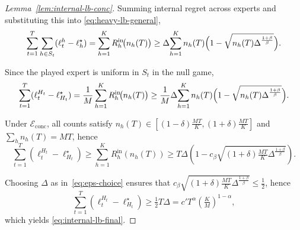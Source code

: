 \documentclass[a4paper,14pt]{extarticle}
\theoremstyle{plain}
\begin{document}
\begin{proof}[ Lemma~\ref{lem:internal-lb-conc}]
Summing internal regret across experts and substituting this into \eqref{eq:heavy-lb-general},
\begin{equation*}
\sum_{t=1}^T \sum_{h\in S_t} (\ell_t^h - \ell_h^\star) =\sum_{h=1}^K R_h^{\mathrm{in}}\!\bigl(n_h(T)\bigr) \ge
\Delta \!\sum_{h=1}^K n_h(T)\Bigl(1 -\sqrt{n_h(T)\Delta^{\frac{1+\beta}{\beta}}}\Bigr).
\end{equation*}

Since the played expert is uniform in $S_t$ in the null game,
\begin{equation*}
\sum_{t=1}^T (\ell_t^{H_t} - \ell_{H_t}^\star)
=\frac{1}{M}\sum_{h=1}^K R_h^{\mathrm{in}}\!\bigl(n_h(T)\bigr) \ge
\frac{1}{M}\Delta \!\sum_{h=1}^K n_h(T)\Bigl(1 -\sqrt{n_h(T)\Delta^{\frac{1+\beta}{\beta}}}\Bigr).
\end{equation*}

Under $\mathcal E_{\mathrm{conc}}$, all counts satisfy
$n_h(T)\in[(1-\delta)\tfrac{MT}{K},(1+\delta)\tfrac{MT}{K}]$
and $\sum_h n_h(T)=MT$, hence
\begin{equation*}
\sum_{t=1}^T (\ell_t^{H_t} - \ell_{H_t}^\star)
\ge
\sum_{h=1}^K R_h^{\mathrm{in}}(n_h(T))
\ge
T\Delta\!\left(1 - c_\beta\sqrt{(1+\delta)\tfrac{MT}{K}\Delta^{\frac{1+\beta}{\beta}}}\right).
\end{equation*}

Choosing $\Delta$ as in~\eqref{eq:eps-choice} ensures that
$c_\beta\sqrt{(1+\delta)\tfrac{MT}{K}\Delta^{\frac{1+\beta}{\beta}}} \le \tfrac{1}{2}$,
hence
\begin{equation*}
\sum_{t=1}^T (\ell_t^{H_t} - \ell_{H_t}^\star)\ge
\tfrac{1}{2}T\Delta
=
c'T^{\alpha}\!\left(\tfrac{K}{M}\right)^{1-\alpha},
\end{equation*}
which yields \eqref{eq:internal-lb-final}.
\end{proof}
\end{document}
